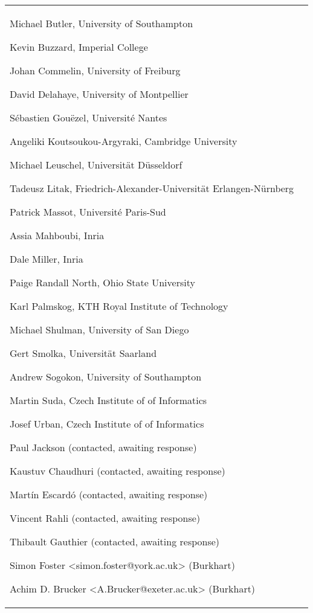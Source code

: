 \begin{longtable}{|p{}|p{}|}
\begin{framed}
\begin{compactitem}
\item Michael Butler, University of Southampton
\item Kevin Buzzard, Imperial College %
\item Johan Commelin, University of Freiburg
\item David Delahaye, University of Montpellier %
\item Sébastien Gouëzel, Université Nantes %
\item Angeliki Koutsoukou-Argyraki, Cambridge University %
\item Michael Leuschel, Universität Düsseldorf
\item Tadeusz Litak, Friedrich-Alexander-Universität Erlangen-Nürnberg
\item Patrick Massot, Université Paris-Sud %
\item Assia Mahboubi, Inria %
\item Dale Miller, Inria
\item Paige Randall North, Ohio State University
\item Karl Palmskog,  KTH Royal Institute of Technology %
\item Michael Shulman, University of San Diego
\item Gert Smolka, Universität Saarland %
\item Andrew Sogokon, University of Southampton
\item Martin Suda, Czech Institute of of Informatics
\item Josef Urban, Czech Institute of of Informatics



\item Paul Jackson (contacted, awaiting response)
\item Kaustuv Chaudhuri (contacted, awaiting response)
\item Martín Escardó (contacted, awaiting response)
\item Vincent Rahli (contacted, awaiting response)
\item Thibault Gauthier (contacted, awaiting response)

\item Simon Foster <simon.foster@york.ac.uk> (Burkhart)
\item Achim D. Brucker <A.Brucker@exeter.ac.uk> (Burkhart)


\end{compactitem}
\end{framed}
\end{longtable}
